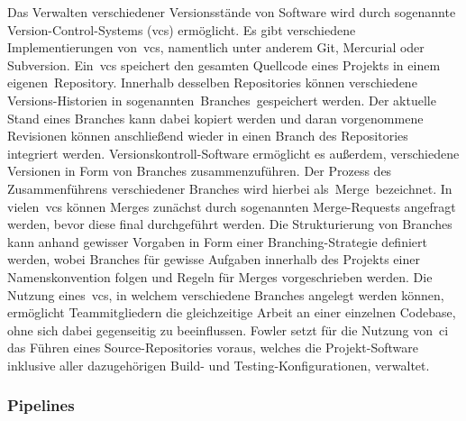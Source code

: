 Das Verwalten verschiedener Versionsstände von Software wird durch sogenannte Version-Control-Systems (\acrshort{vcs})
ermöglicht.
Es gibt verschiedene Implementierungen von\ \acrshort{vcs}, namentlich unter anderem Git, Mercurial oder Subversion.
Ein\ \acrshort{vcs} speichert den gesamten Quellcode eines Projekts in einem eigenen\ \glqq Repository\grqq.
Innerhalb desselben Repositories können verschiedene Versions-Historien in sogenannten\ \glqq Branches\grqq\ gespeichert
werden.
Der aktuelle Stand eines Branches kann dabei kopiert werden und daran vorgenommene Revisionen können anschließend wieder
in einen Branch des Repositories integriert werden.
Versionskontroll-Software ermöglicht es außerdem, verschiedene Versionen in Form von Branches zusammenzuführen.
Der Prozess des Zusammenführens verschiedener Branches wird hierbei als\ \glqq Merge\grqq\ bezeichnet.
In vielen\ \acrshort{vcs} können Merges zunächst durch sogenannten Merge-Requests angefragt werden, bevor diese
final durchgeführt werden.
Die Strukturierung von Branches kann anhand gewisser Vorgaben in Form einer Branching-Strategie definiert werden, wobei
Branches für gewisse Aufgaben innerhalb des Projekts einer Namenskonvention folgen und Regeln für Merges
vorgeschrieben werden.
Die Nutzung eines\ \acrshort{vcs}, in welchem verschiedene Branches angelegt werden können, ermöglicht Teammitgliedern
die gleichzeitige Arbeit an einer einzelnen Codebase, ohne sich dabei gegenseitig zu beeinflussen.
Fowler setzt für die Nutzung von\ \acrshort{ci} das Führen eines Source-Repositories voraus, welches die
Projekt-Software inklusive aller dazugehörigen Build- und Testing-Konfigurationen, verwaltet.

\subsubsection{Pipelines}


